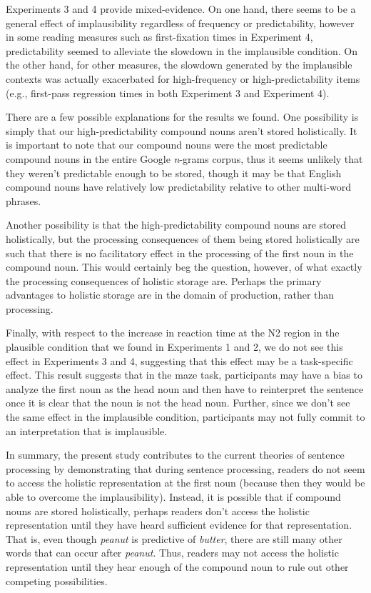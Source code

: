 \documentclass[
  12pt,
  letterpaper,
]{scrreprt}
\begin{document}
Experiments 3 and 4 provide mixed-evidence. On one hand, there seems to
be a general effect of implausibility regardless of frequency or
predictability, however in some reading measures such as first-fixation
times in Experiment 4, predictability seemed to alleviate the slowdown
in the implausible condition. On the other hand, for other measures, the
slowdown generated by the implausible contexts was actually exacerbated
for high-frequency or high-predictability items (e.g., first-pass
regression times in both Experiment 3 and Experiment 4).

There are a few possible explanations for the results we found. One
possibility is simply that our high-predictability compound nouns aren't
stored holistically. It is important to note that our compound nouns
were the most predictable compound nouns in the entire Google
\emph{n}-grams corpus, thus it seems unlikely that they weren't
predictable enough to be stored, though it may be that English compound
nouns have relatively low predictability relative to other multi-word
phrases.

Another possibility is that the high-predictability compound nouns are
stored holistically, but the processing consequences of them being
stored holistically are such that there is no facilitatory effect in the
processing of the first noun in the compound noun. This would certainly
beg the question, however, of what exactly the processing consequences
of holistic storage are. Perhaps the primary advantages to holistic
storage are in the domain of production, rather than processing.

Finally, with respect to the increase in reaction time at the N2 region
in the plausible condition that we found in Experiments 1 and 2, we do
not see this effect in Experiments 3 and 4, suggesting that this effect
may be a task-specific effect. This result suggests that in the maze
task, participants may have a bias to analyze the first noun as the head
noun and then have to reinterpret the sentence once it is clear that the
noun is not the head noun. Further, since we don't see the same effect
in the implausible condition, participants may not fully commit to an
interpretation that is implausible.

In summary, the present study contributes to the current theories of
sentence processing by demonstrating that during sentence processing,
readers do not seem to access the holistic representation at the first
noun (because then they would be able to overcome the implausibility).
Instead, it is possible that if compound nouns are stored holistically,
perhaps readers don't access the holistic representation until they have
heard sufficient evidence for that representation. That is, even though
\emph{peanut} is predictive of \emph{butter}, there are still many other
words that can occur after \emph{peanut}. Thus, readers may not access
the holistic representation until they hear enough of the compound noun
to rule out other competing possibilities.
\end{document}

